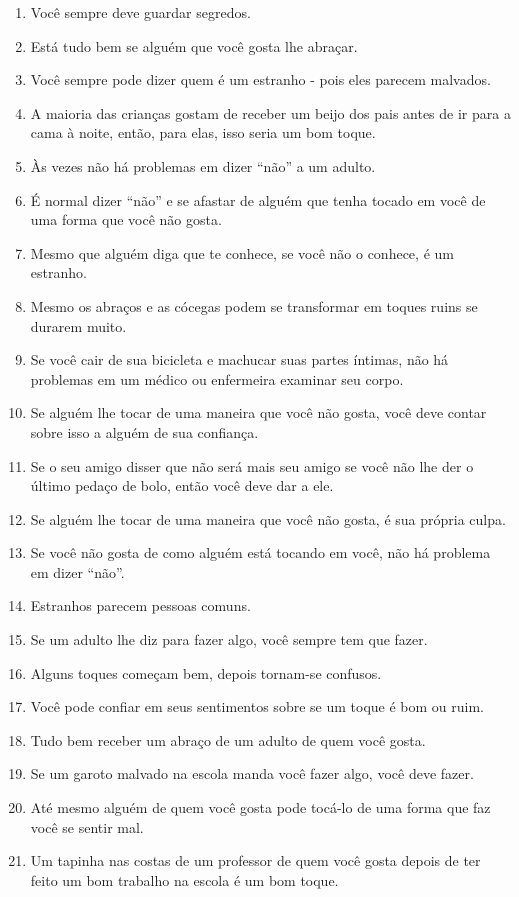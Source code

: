 \begin{apendicesenv}
\begin{enumerate}
	\item Você sempre deve guardar segredos.
	\item Está tudo bem se alguém que você gosta lhe abraçar.
	\item Você sempre pode dizer quem é um estranho - pois eles parecem malvados.
	\item A maioria das crianças gostam de receber um beijo dos pais antes de ir para a cama à noite, então, para elas, isso seria um bom toque.
	\item Às vezes não há problemas em dizer ``não'' a um adulto.
	\item É normal dizer ``não'' e se afastar de alguém que tenha tocado em você de uma forma que você não gosta.
	\item Mesmo que alguém diga que te conhece, se você não o conhece, é um estranho.
	\item Mesmo os abraços e  as cócegas podem se transformar em toques ruins se durarem muito.
	\item Se você cair de sua bicicleta e machucar suas partes íntimas, não há problemas em um médico ou enfermeira examinar seu corpo.
	\item Se alguém lhe tocar de uma maneira que você não gosta, você deve contar sobre isso a alguém de sua confiança.
	\item Se o seu amigo disser que não será mais seu amigo se você não lhe der o último pedaço de bolo, então você deve dar a ele.
	\item Se alguém lhe tocar de uma maneira que você não gosta, é sua própria culpa.
	\item Se você não gosta de como alguém está tocando em você, não há problema em dizer ``não''.
	\item Estranhos parecem pessoas comuns.
	\item Se um adulto lhe diz para fazer algo, você sempre tem que fazer.
	\item Alguns toques começam bem, depois tornam-se confusos.
	\item Você pode confiar em seus sentimentos sobre se um toque é bom ou ruim.
	\item Tudo bem receber um abraço de um adulto de quem você gosta.
	\item Se um garoto malvado na escola manda você fazer algo, você deve fazer.
	\item Até mesmo alguém de quem você gosta pode tocá-lo de uma forma que faz você se sentir mal.
	\item Um tapinha nas costas de um professor de quem você gosta depois de ter feito um bom trabalho na escola é um bom toque.

\end{enumerate}
\end{apendicesenv}
